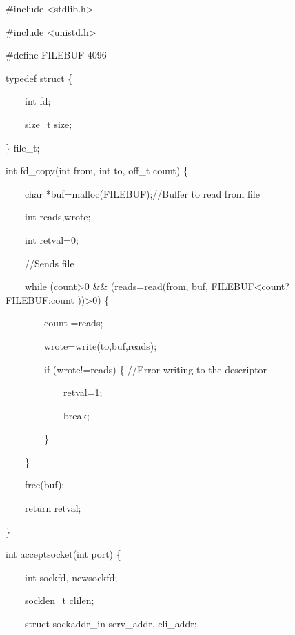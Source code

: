 \documentclass[a4paper,11pt]{article}
\begin{document}
{\ttfamily
\#include {\textless}stdlib.h{\textgreater}}

{\ttfamily
\#include {\textless}unistd.h{\textgreater}}


\bigskip

{\ttfamily
\#define FILEBUF 4096}


\bigskip

{\ttfamily
typedef struct \{}

{\ttfamily
\ \ \ \ int fd;}

{\ttfamily
\ \ \ \ size\_t size;}

{\ttfamily
\} file\_t;}


\bigskip

{\ttfamily
int fd\_copy(int from, int to, off\_t count) \{}

{\ttfamily
\ \ \ \ char *buf=malloc(FILEBUF);//Buffer to read from file}

{\ttfamily
\ \ \ \ int reads,wrote;}

{\ttfamily
\ \ \ \ int retval=0;}


\bigskip

{\ttfamily
\ \ \ \ //Sends file}

{\ttfamily
\ \ \ \ while (count{\textgreater}0 \&\& (reads=read(from, buf,
FILEBUF{\textless}count? FILEBUF:count )){\textgreater}0) \{}

{\ttfamily
\ \ \ \ \ \ \ \ count-=reads;}

{\ttfamily
\ \ \ \ \ \ \ \ wrote=write(to,buf,reads);}

{\ttfamily
\ \ \ \ \ \ \ \ if (wrote!=reads) \{ //Error writing to the descriptor}

{\ttfamily
\ \ \ \ \ \ \ \ \ \ \ \ retval=1;}

{\ttfamily
\ \ \ \ \ \ \ \ \ \ \ \ break;}

{\ttfamily
\ \ \ \ \ \ \ \ \}}

{\ttfamily
\ \ \ \ \}}


\bigskip

{\ttfamily
\ \ \ \ free(buf);}

{\ttfamily
\ \ \ \ return retval;}

{\ttfamily
\}}


\bigskip

{\ttfamily
int acceptsocket(int port) \{}

{\ttfamily
\ \ \ \ int sockfd, newsockfd;}

{\ttfamily
\ \ \ \ socklen\_t clilen;}

{\ttfamily
\ \ \ \ struct sockaddr\_in serv\_addr, cli\_addr;}
\end{document}
